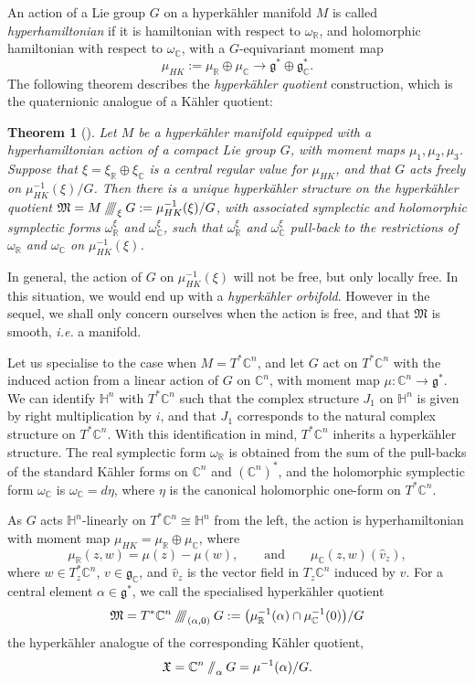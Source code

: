\documentclass{article}
\newtheorem{theorem}{Theorem}[section]
\newcommand{\ie}{\emph{i.e.} }
\newcommand{\w}{\omega}
\newcommand{\K}{K\"ahler }
\newcommand{\HK}{hyperk\"ahler }
\newcommand{\RR}{\mathbb{R}}
\newcommand{\CC}{\mathbb{C}}
\newcommand{\HH}{\mathbb{H}}
\newcommand{\mf}[1]{\mathfrak{#1}}
\newcommand{\sslash}{\mathbin{/\mkern-6mu/}}
\newcommand{\sssslash}{\mathbin{/\mkern-6mu/\mkern-6mu/\mkern-6mu/}}
\begin{document}
	An action of a Lie group $G$ on a \HK manifold $M$ is called \emph{hyperhamiltonian} if it is hamiltonian with respect to $\w_{\RR}$, and holomorphic hamiltonian with respect to $\w_{\CC}$, with a $G$-equivariant moment map
	$$
	\mu_{HK} := \mu_{\RR} \oplus \mu_{\CC} \longrightarrow \mf{g}^{\ast} \oplus \mf{g}_{\CC}^{\ast}.
	$$
	The following theorem describes the \emph{\HK quotient} construction, which is the quaternionic analogue of a \K quotient:
	
	\begin{theorem}[\cite{HKLR87}]
		Let $M$ be a \HK manifold equipped with a hyperhamiltonian action of a compact Lie group $G$, with moment maps $\mu_{1}, \mu_{2}, \mu_{3}$. Suppose that $\xi = \xi_{\RR} \oplus \xi_{\CC}$ is a central regular value for $\mu_{HK}$, and that $G$ acts freely on $\mu_{HK}^{-1}(\xi)/G$. Then there is a unique \HK structure on the \HK quotient $\mf{M} = M\sssslash_{\xi}G := \mu_{HK}^{-1}(\xi)/G$, with associated symplectic and holomorphic symplectic forms $\w_{\RR}^{\xi}$ and $\w_{\CC}^{\xi}$, such that $\w_{\RR}^{\xi}$ and $\w_{\CC}^{\xi}$ pull-back to the restrictions of $\w_{\RR}$ and $\w_{\CC}$ on $\mu_{HK}^{-1}(\xi)$.
	\end{theorem}
	In general, the action of $G$ on $\mu_{HK}^{-1}(\xi)$ will not be free, but only locally free. In this situation, we would end up with a \emph{\HK orbifold}. However in the sequel, we shall only concern ourselves when the action is free, and that $\mf{M}$ is smooth, \ie a manifold.
	
	Let us specialise to the case when $M = T^{\ast}\CC^{n}$, and let $G$ act on $T^{\ast}\CC^{n}$ with the induced action from a linear action of $G$ on $\CC^{n}$, with moment map $\mu : \CC^{n} \rightarrow \mf{g}^{\ast}$. We can identify $\HH^{n}$ with $T^{\ast}\CC^{n}$ such that the complex structure $J_{1}$ on $\HH^{n}$ is given by right multiplication by $i$, and that $J_{1}$ corresponds to the natural complex structure on $T^{\ast}\CC^{n}$. With this identification in mind, $T^{\ast}\CC^{n}$ inherits a \HK structure. The real symplectic form $\w_{\RR}$ is obtained from the sum of the pull-backs of the standard \K forms on $\CC^{n}$ and $(\CC^{n})^{\ast}$, and the holomorphic symplectic form $\w_{\CC}$ is $\w_{\CC} = d\eta$, where $\eta$ is the canonical holomorphic one-form on $T^{\ast}\CC^{n}$.
	
	As $G$ acts $\HH^{n}$-linearly on $T^{\ast}\CC^{n} \cong \HH^{n}$ from the left, the action is hyperhamiltonian with moment map $\mu_{HK} = \mu_{\RR} \oplus \mu_{\CC}$, where
	$$
	\mu_{\RR}(z,w) = \mu(z) - \mu(w),\qquad \text{and} \qquad \mu_{\CC}(z,w)(\hat{v}_{z}),
	$$
	where $w\in T_{z}^{\ast}\CC^{n}$, $v \in \mf{g}_{\CC}$, and $\hat{v}_{z}$ is the vector field in $T_{z}\CC^{n}$ induced by $v$. For a central element $\alpha \in \mf{g}^{\ast}$, we call the specialised \HK quotient
	$$
	\mf{M} = T^{\ast}\CC^{n}\sssslash_{(\alpha,0)}G := \big( \mu_{\RR}^{-1}(\alpha) \cap \mu_{\CC}^{-1}(0)\big)/G
	$$
	the \HK analogue of the corresponding \K quotient,
	$$
	\mf{X} = \CC^{n} \sslash_{\alpha} G = \mu^{-1}(\alpha)/G.
	$$
	
\end{document}
